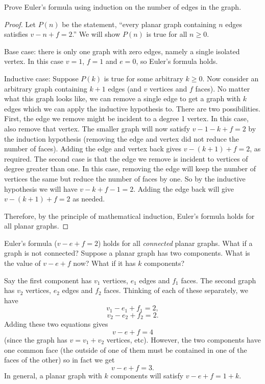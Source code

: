 \begin{questions}
\question Prove Euler's formula using induction on the number of edges in the graph.

	\begin{answer}
		\begin{proof}
			Let $P(n)$ be the statement, ``every planar graph containing $n$ edges satisfies $v - n + f = 2$.''  We will show $P(n)$ is true for all $n \ge 0$.  
			
			Base case: there is only one graph with zero edges, namely a single isolated vertex.  In this case $v = 1$, $f = 1$ and $e = 0$, so Euler's formula holds.
			
			Inductive case:  Suppose $P(k)$ is true for some arbitrary $k \ge 0$.  Now consider an arbitrary graph containing $k+1$ edges (and $v$ vertices and $f$ faces).  No matter what this graph looks like, we can remove a single edge to get a graph with $k$ edges which we can apply the inductive hypothesis to.  There are two possibilities.  First, the edge we remove might be incident to a degree 1 vertex.  In this case, also remove that vertex.  The smaller graph will now satisfy $v-1 - k + f = 2$ by the induction hypothesis (removing the edge and vertex did not reduce the number of faces).  Adding the edge and vertex back gives $v - (k+1) + f = 2$, as required.  The second case is that the edge we remove is incident to vertices of degree greater than one.  In this case, removing the edge will keep the number of vertices the same but reduce the number of faces by one.  So by the inductive hypothesis we will have $v - k + f-1 = 2$.  Adding the edge back will give $v - (k+1) + f = 2$ as needed.
			
			Therefore, by the principle of mathematical induction, Euler's formula holds for all planar graphs.
		\end{proof}
	\end{answer}



\question Euler's formula ($v - e + f = 2$) holds for all \emph{connected} planar graphs.  What if a graph is not connected?  Suppose a planar graph has two components.  What is the value of $v - e + f$ now?  What if it has $k$ components?

	\begin{answer}
		Say the first component has $v_1$ vertices, $e_1$ edges and $f_1$ faces.  The second graph has $v_2$ vertices, $e_2$ edges and $f_2$ faces.  Thinking of each of these separately, we have 
		\[v_1 - e_1 + f_1 = 2,\]
		\[v_2 - e_2 + f_2 = 2.\]
		Adding these two equations gives
		\[v - e + f = 4\]
		(since the graph has $v = v_1 + v_2$ vertices, etc).  However, the two components have one common face (the outside of one of them must be contained in one of the faces of the other) so in fact we get
		\[v - e + f = 3.\]
		In general, a planar graph with $k$ components will satisfy $v - e + f = 1 + k$.
	\end{answer}





\end{questions}
